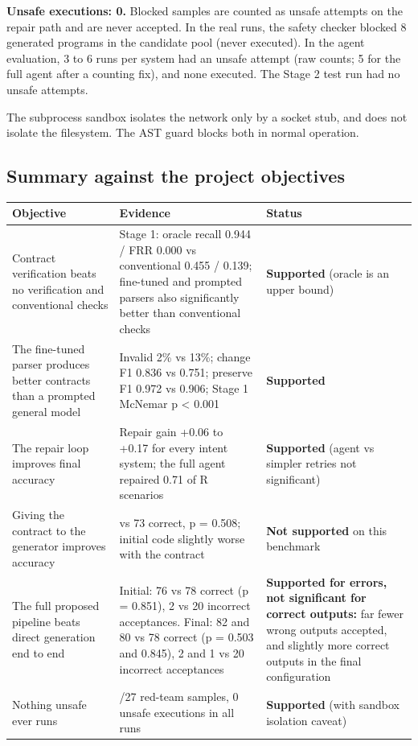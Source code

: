 \documentclass[11pt]{article}
\begin{document}
\textbf{Unsafe executions: 0.} Blocked samples are counted as unsafe
attempts on the repair path and are never accepted. In the real runs,
the safety checker blocked 8 generated programs in the candidate pool
(never executed). In the agent evaluation, 3 to 6 runs per system had an
unsafe attempt (raw counts; 5 for the full agent after a counting fix),
and none executed. The Stage 2 test run had no unsafe attempts.

The subprocess sandbox isolates the network only by a socket stub, and
does not isolate the filesystem. The AST guard blocks both in normal
operation.

\subsection{Summary against the project objectives}

\begin{table}[!tp]
\centering\footnotesize\setlength{\tabcolsep}{3pt}\renewcommand{\arraystretch}{1.1}
\begin{tabularx}{\textwidth}{>{\raggedright\arraybackslash}X>{\raggedright\arraybackslash}X>{\raggedright\arraybackslash}X}
\toprule
\textbf{Objective} & \textbf{Evidence} & \textbf{Status} \\
\midrule
Contract verification beats no verification and conventional checks & Stage 1: oracle recall 0.944 / FRR 0.000 vs conventional 0.455 / 0.139; fine-tuned and prompted parsers also significantly better than conventional checks & \textbf{Supported} (oracle is an upper bound) \\
The fine-tuned parser produces better contracts than a prompted general model & Invalid 2\% vs 13\%; change F1 0.836 vs 0.751; preserve F1 0.972 vs 0.906; Stage 1 McNemar p < 0.001 & \textbf{Supported} \\
The repair loop improves final accuracy & Repair gain +0.06 to +0.17 for every intent system; the full agent repaired 0.71 of R scenarios & \textbf{Supported} (agent vs simpler retries not significant) \\
Giving the contract to the generator improves accuracy & 76 vs 73 correct, p = 0.508; initial code slightly worse with the contract & \textbf{Not supported} on this benchmark \\
The full proposed pipeline beats direct generation end to end & Initial: 76 vs 78 correct (p = 0.851), 2 vs 20 incorrect acceptances. Final: 82 and 80 vs 78 correct (p = 0.503 and 0.845), 2 and 1 vs 20 incorrect acceptances & \textbf{Supported for errors, not significant for correct outputs:} far fewer wrong outputs accepted, and slightly more correct outputs in the final configuration \\
Nothing unsafe ever runs & 27/27 red-team samples, 0 unsafe executions in all runs & \textbf{Supported} (with sandbox isolation caveat) \\
\bottomrule
\end{tabularx}
\end{table}
\end{document}
